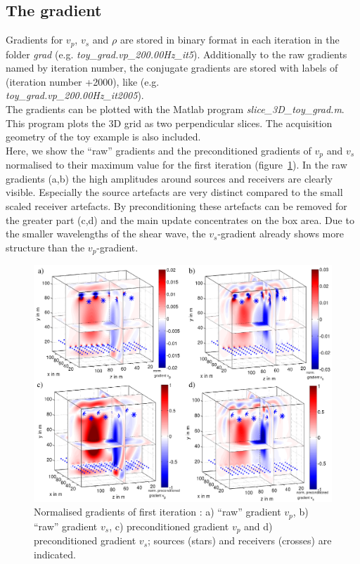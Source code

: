 \subsection{The gradient} 
Gradients for $v_p$, $v_s$ and $\rho$ are stored in binary format in each iteration in the folder \textit{grad} (e.g. \textit{toy\_grad.vp\_200.00Hz\_it5}). Additionally to the raw gradients named by iteration number, the conjugate gradients are stored with labels of (iteration number +2000), like  (e.g. \\ \textit{toy\_grad.vp\_200.00Hz\_it2005}). \\
The gradients can be plotted with the Matlab program \textit{slice\_3D\_toy\_grad.m}. This program plots the 3D grid as two perpendicular slices. The acquisition geometry of the toy example is also included. \\
Here, we show the ``raw'' gradients and the preconditioned gradients of $v_p$ and $v_s$ normalised to their maximum value for the first iteration (figure~\ref{fig:toy_grad}). In the raw gradients (a,b) the high amplitudes around sources and receivers are clearly visible. Especially the source artefacts are very distinct compared to the small scaled receiver artefacts. By preconditioning these artefacts can be removed for the greater part (c,d) and the main update concentrates on the box area. Due to the smaller wavelengths of the shear wave, the $v_s$-gradient already shows more structure than the $v_p$-gradient. 
\begin{figure}[h!]
\begin{center}
\includegraphics[width=\textwidth]{fig_toy/grad_toy}
\caption[Toy example - gradient before and after preconditioning]{Normalised gradients of first iteration : a) ``raw'' gradient $v_p$, b) ``raw'' gradient $v_s$, c) preconditioned gradient $v_p$ and d) preconditioned gradient $v_s$; sources (stars) and receivers (crosses) are indicated. }\label{fig:toy_grad}
\end{center}
\end{figure}
